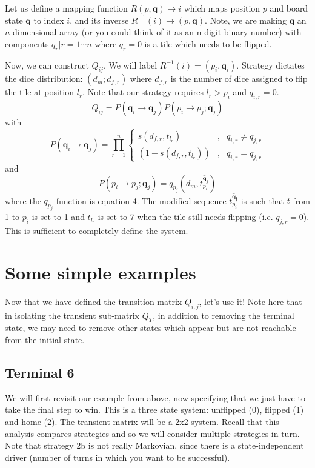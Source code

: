 \documentclass[letterpaper,11pt]{article}
\begin{document}
Let us define a mapping function
$R(p,\mathbf{q})\rightarrow i$ which maps position $p$ and board state 
$\mathbf{q}$ to index $i$, and its inverse 
$R^{-1}(i)\rightarrow(p,\mathbf{q})$.  Note, we are
making $\mathbf{q}$ an $n$-dimensional array (or you could think of it as an
n-digit binary number) with components $q_r|r=1\cdots n$ where $q_r=0$ is a
tile which needs to be flipped.  

Now, we can
construct $Q_{ij}$.  We will label $R^{-1}(i) = (p_i, \mathbf{q}_i)$.  Strategy
dictates the dice distribution: $(d_m;d_{f,r})$ where $d_{f,r}$ is the number
of dice assigned to flip the tile at position $l_r$.  Note that our strategy
requires $l_r>p_i$ and $q_{i,r}=0$.
\[
	Q_{ij} = P(\mathbf{q}_i\rightarrow\mathbf{q}_j)P(p_i \rightarrow p_j;\mathbf{q}_j)
\]
with
\[
	P(\mathbf{q}_i\rightarrow\mathbf{q}_j)=\prod_{r=1}^{n} 
	\left\{
		\begin{array}{lrl}
			s(d_{f,r},t_{l_r}) & , & q_{i,r} \neq q_{j,r} \\
			\left(1-s(d_{f,r},t_{l_r})\right) &,& q_{i,r} = q_{j,r}
		\end{array}
	\right. 
\]
and
\[
	P(p_i \rightarrow p_j;\mathbf{q}_j)=q_{p_j}(d_m,\overline{t_{p_i}^{\mathbf{q}_j}})
\]
where the $q_{p_j}$ function is equation 4.  The modified sequence 
$\overline{t_{p_i}^\mathbf{q_j}}$ is such that $t$ from 1 to $p_i$ is set to 1 and
$t_{l_r}$ is set to 7 when the tile still needs flipping (i.e. $q_{j,r}=0$).
This is sufficient to completely define the system.

\section{Some simple examples}
Now that we have defined the transition matrix $Q_{i,j}$, let's use it!  Note
here that in isolating the transient sub-matrix $Q_T$, in addition to removing
the terminal state, we may need to remove other states which appear but are
not reachable from the initial state.  

\subsection{Terminal 6}
We will first revisit our example from above, now specifying that we just
have to take the final step to win.  This is a three state system: unflipped
(0), flipped (1) and home (2).  The transient matrix will be a 2x2 system.
Recall that this analysis compares strategies and so we will consider multiple
strategies in turn.  Note that strategy 2b is not really Markovian, since
there is a state-independent driver (number of turns in which you want to be
successful). 
\end{document}
